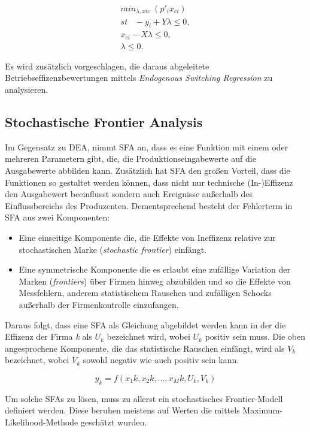 \begin{gather}
	min_{\lambda,xic} \; (p'_{i}x_{ci}) \\
	st \;\;\; - y_i+Y\lambda \leq 0, \\
	x_{ci} - X \lambda \leq 0, \\
	\lambda \leq 0.
\end{gather}

Es wird zusätzlich vorgeschlagen, die daraus abgeleitete Betriebseffizenzbewertungen mittels \textit{Endogenous Switching Regression} zu analysieren.


\subsection{Stochastische Frontier Analysis}
Im Gegensatz zu DEA, nimmt SFA an, dass es eine Funktion mit einem oder mehreren Parametern gibt, die, die Produktionseingabewerte auf die Ausgabewerte abbilden kann. Zusätzlich hat SFA den großen Vorteil, dass die Funktionen so gestaltet werden können, dass nicht nur technische (In-)Effizenz den Ausgabewert beeinflusst sondern auch Ereignisse außerhalb des Einflussbereichs des Produzenten. Dementsprechend besteht der Fehlerterm in SFA aus zwei Komponenten:
\begin{itemize}
	\item Eine einseitige Komponente die, die Effekte von Ineffizenz relative zur stochastischen Marke (\textit{stochastic frontier}) einfängt.
	\item Eine symmetrische Komponente die es erlaubt eine zufällige Variation der Marken (\textit{frontiers}) über Firmen hinweg abzubilden und so die Effekte von Messfehlern, anderem statistischem Rauschen und zufälligen Schocks außerhalb der Firmenkontrolle einzufangen.
\end{itemize}

Daraus folgt, dass eine SFA als Gleichung abgebildet werden kann in der die Effizenz der Firma \textit{k} als $U_k$ bezeichnet wird, wobei $U_k$ positiv sein muss. Die oben angesprochene Komponente, die das statistische Rauschen einfängt, wird als $V_k$ bezeichnet, wobei $V_k$ sowohl negativ wie auch positiv sein kann.\cite{jour:Cullinane2006}

\begin{equation}\label{eq:sfadef}
	y_k = f(x_1k,x_2k,...,x_Mk,U_k,V_k)
\end{equation}

Um solche SFAs zu lösen, muss zu allerst ein stochastisches Frontier-Modell definiert werden. Diese beruhen meistens auf Werten die mittels Maximum-Likelihood-Methode geschätzt wurden.

